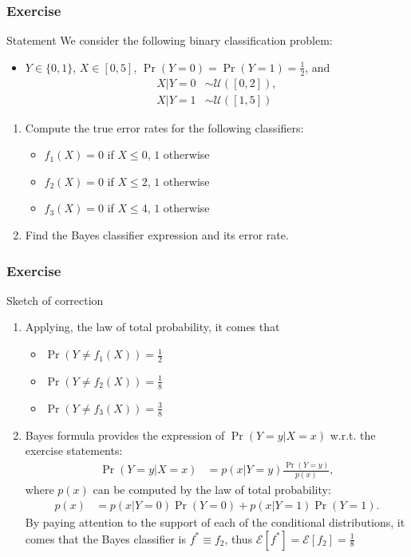 \documentclass[compress, smaller, serif, 9pt]{beamer}
\begin{document}
\begin{frame}
  \frametitle{Exercise}
\begin{block}{Statement}
We consider the following binary classification problem:
\begin{itemize}
 \item $Y \in \{0,1\}$, $X \in [0,5]$, $\Pr(Y=0)=\Pr(Y=1)=\frac{1}{2}$, and
 \begin{align*}
  X|Y=0 &\sim \mathcal{U}\left([0,2]\right),\\
  X|Y=1 &\sim \mathcal{U}\left([1,5]\right)
 \end{align*}
\end{itemize}
\begin{enumerate}
 \item Compute the true error rates for the following classifiers:
 \begin{itemize}
 \item $f_1(X) = 0$ if $X \le 0$, $1$ otherwise
 \item $f_2(X) = 0$ if $X \le 2$, $1$ otherwise
 \item $f_3(X) = 0$ if $X \le 4$, $1$ otherwise
\end{itemize}
\item Find the Bayes classifier expression and its error rate. 
\end{enumerate}
 \end{block}
\end{frame}

\begin{frame}
  \frametitle{Exercise}
\begin{block}{Sketch of correction}
\begin{enumerate}
 \item Applying, the law of total probability, it comes that 
 \begin{itemize}
 \item $\Pr( Y \ne f_1(X) ) = \frac{1}{2}$
 \item $\Pr( Y \ne f_2(X) ) = \frac{1}{8}$
 \item $\Pr( Y \ne f_3(X) ) = \frac{3}{8}$
\end{itemize}
\item Bayes formula provides the expression of $\Pr( Y=y| X=x)$ w.r.t. the 
exercise statements:
 \begin{align*}
  \Pr( Y=y| X=x)  &=  p( x| Y=y ) \frac{\Pr(Y=y)}{p(x)},
 \end{align*}
 where $p(x)$ can be computed by the law of total probability:
  \begin{align*}
  p(x)  &=  p( x| Y=0) \Pr(Y=0) +   p( x| Y=1) \Pr(Y=1).
 \end{align*}
 By paying attention to the support of each of the conditional distributions,
 it comes that the Bayes classifier is
$f^{\ast} \equiv f_2$, thus $\mathcal{E}[f^{\ast} ]=\mathcal{E}[f_2]= \frac{1}{8}$
\end{enumerate}
 \end{block}
\end{frame}
\end{document}
